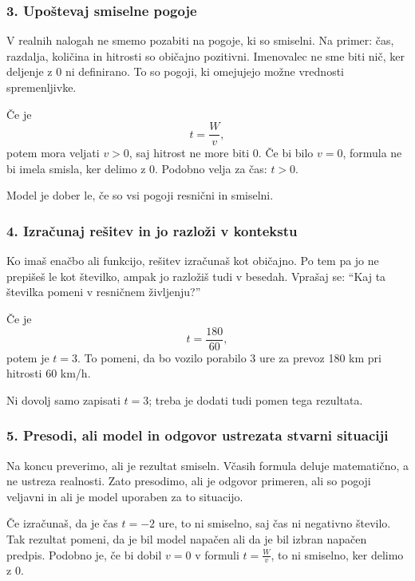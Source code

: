 \documentclass[11pt]{article}
\begin{document}
\subsubsection*{3. Upoštevaj smiselne pogoje}
V realnih nalogah ne smemo pozabiti na pogoje, ki so smiselni. Na primer: čas, razdalja, količina in hitrosti so običajno pozitivni. Imenovalec ne sme biti nič, ker deljenje z 0 ni definirano. To so pogoji, ki omejujejo možne vrednosti spremenljivke.

\begin{primerbox}
Če je
\[
 t=\frac{W}{v},
\]
potem mora veljati $v>0$, saj hitrost ne more biti 0. Če bi bilo $v=0$, formula ne bi imela smisla, ker delimo z 0. Podobno velja za čas: $t>0$.

Model je dober le, če so vsi pogoji resnični in smiselni.
\end{primerbox}

\subsubsection*{4. Izračunaj rešitev in jo razloži v kontekstu}
Ko imaš enačbo ali funkcijo, rešitev izračunaš kot običajno. Po tem pa jo ne prepišeš le kot številko, ampak jo razložiš tudi v besedah. Vprašaj se: “Kaj ta številka pomeni v resničnem življenju?”

\begin{primerbox}
Če je
\[
 t=\frac{180}{60},
\]
potem je $t=3$. To pomeni, da bo vozilo porabilo 3 ure za prevoz 180 km pri hitrosti 60 km/h.

Ni dovolj samo zapisati $t=3$; treba je dodati tudi pomen tega rezultata.
\end{primerbox}

\subsubsection*{5. Presodi, ali model in odgovor ustrezata stvarni situaciji}
Na koncu preverimo, ali je rezultat smiseln. Včasih formula deluje matematično, a ne ustreza realnosti. Zato presodimo, ali je odgovor primeren, ali so pogoji veljavni in ali je model uporaben za to situacijo.

\begin{primerbox}
Če izračunaš, da je čas $t=-2$ ure, to ni smiselno, saj čas ni negativno število. Tak rezultat pomeni, da je bil model napačen ali da je bil izbran napačen predpis. Podobno je, če bi dobil $v=0$ v formuli $t=\frac{W}{v}$, to ni smiselno, ker delimo z 0.
\end{primerbox}
\end{document}
